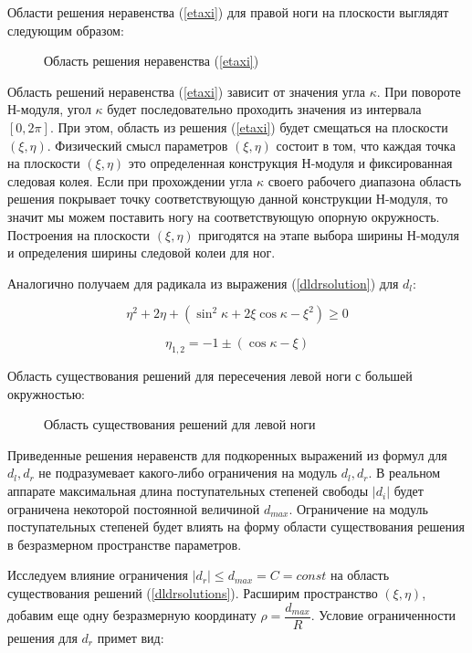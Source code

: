 Области решения неравенства (\ref{etaxi}) для правой ноги на плоскости выглядят следующим образом:

\begin{figure}[!h]
\caption{Область решения неравенства (\ref{etaxi})}
\end{figure}

Область решений неравенства (\ref{etaxi}) зависит от значения угла $\kappa$. При повороте Н-модуля, угол $\kappa$ будет последовательно проходить значения из интервала $[0,2\pi]$. При этом, область из решения (\ref{etaxi}) будет смещаться на плоскости $(\xi,\eta)$. Физический смысл параметров $(\xi,\eta)$ состоит в том, что каждая точка на плоскости $(\xi,\eta)$ это определенная конструкция Н-модуля и фиксированная следовая колея. Если при прохождении угла $\kappa$ своего рабочего диапазона область решения покрывает точку соответствующую данной конструкции Н-модуля, то значит мы можем поставить ногу на соответствующую опорную окружность. Построения на плоскости $(\xi,\eta)$ пригодятся на этапе выбора ширины Н-модуля и определения ширины следовой колеи для ног.

Аналогично получаем для радикала из выражения (\ref{dldrsolution}) для $d_l$:

\begin{equation}
\eta^2+2\eta+(\sin^2{\kappa}+2\xi\cos{\kappa}-\xi^2)\geq0
\end{equation}

\begin{equation}
\eta_{1,2} = -1\pm(\cos{\kappa}-\xi)
\end{equation}

Область существования решений для пересечения левой ноги с большей окружностью:

\begin{figure}[!h]
\caption{Область существования решений для левой ноги}
\end{figure}

Приведенные решения неравенств для подкоренных выражений из формул для $d_l,d_r$ не подразумевает какого-либо ограничения на модуль $d_l,d_r$. В реальном аппарате максимальная длина поступательных степеней свободы $|d_i|$ будет ограничена некоторой постоянной величиной $d_{max}$. Ограничение на модуль поступательных степеней будет влиять на форму области существования решения в безразмерном пространстве параметров.

Исследуем влияние ограничения $|d_r|\leq d_{max}= C = const$ на область существования решений (\ref{dldrsolutions}). Расширим пространство $(\xi,\eta)$, добавим еще одну безразмерную координату $\rho = \dfrac{d_{max}}{R}$. Условие ограниченности решения для $d_r$ примет вид:

